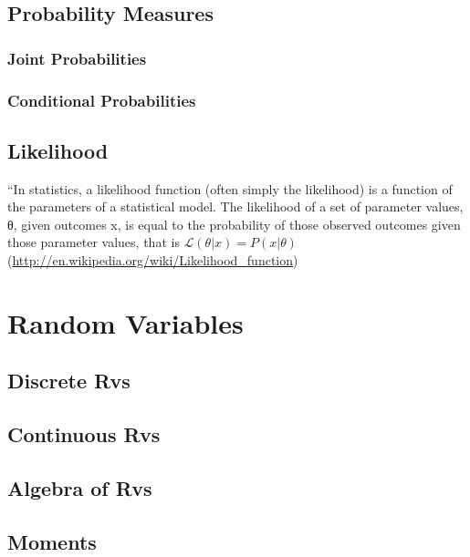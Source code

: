 \documentclass[reqno,12pt]{tufte-book}
\numberwithin{equation}{subsection}
\begin{document}
\section{Probability Measures}

\subsection{Joint Probabilities}

\subsection{Conditional Probabilities}

\section{Likelihood}

``In statistics, a likelihood function (often simply the likelihood)
is a function of the parameters of a statistical model. The likelihood
of a set of parameter values, θ, given outcomes x, is equal to the
probability of those observed outcomes given those parameter values,
that is $\mathcal{L}(\theta |x) = P(x | \theta)$
(\url{http://en.wikipedia.org/wiki/Likelihood_function})

\chapter{Random Variables}

\section{Discrete Rvs}

\section{Continuous Rvs}

\section{Algebra of Rvs}

\section{Moments}
\end{document}
